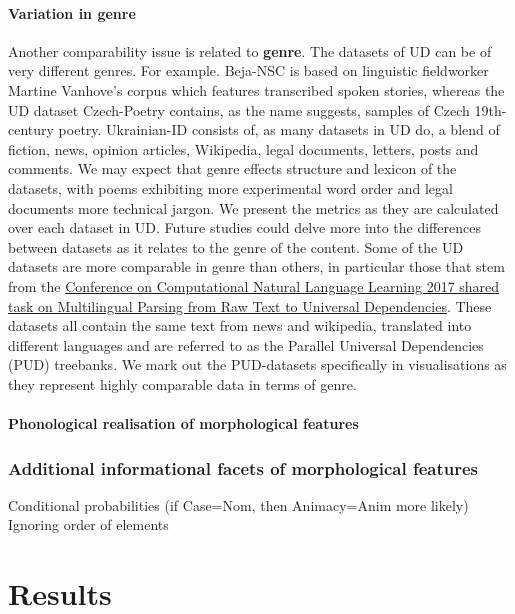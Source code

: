 \documentclass[USenglish]{article}
\begin{document}
\paragraph{Variation in genre}
Another comparability issue is related to \textbf{genre}. 
The datasets of UD can be of very different genres. 
For example. Beja-NSC is based on linguistic fieldworker Martine Vanhove's corpus which features transcribed spoken stories, whereas the UD dataset Czech-Poetry contains, as the name suggests, samples of Czech 19th-century poetry. Ukrainian-ID consists of, as many datasets in UD do, a blend of fiction, news, opinion articles, Wikipedia, legal documents, letters, posts and comments. 
We may expect that genre effects structure and lexicon of the datasets, with poems exhibiting more experimental word order and legal documents more technical jargon. 
We present the metrics as they are calculated over each dataset in UD. Future studies could delve more into the differences between datasets as it relates to the genre of the content.
Some of the UD datasets are more comparable in genre than others, in particular those that stem from the \hyperlink{http://universaldependencies.org/conll17/}{Conference on Computational Natural Language Learning 2017 shared task on Multilingual Parsing from Raw Text to
Universal Dependencies}.
These datasets all contain the same text from news and wikipedia, translated into different languages and are referred to as the Parallel Universal Dependencies (PUD) treebanks.
We mark out the PUD-datasets specifically in visualisations as they represent highly comparable data in terms of genre.




\paragraph{Phonological realisation of morphological features}

\subsubsection{Additional informational facets of morphological features}
\label{caveat_conditional_order}
Conditional probabilities (if Case=Nom, then Animacy=Anim more likely)
Ignoring order of elements





\section{Results}
\end{document}
